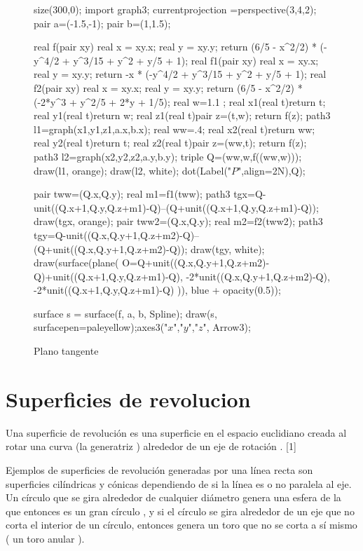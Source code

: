\documentclass[a4paper]{book}
\begin{document}
\begin{figure}[!ht]
	\centering
	\begin{asy}
	size(300,0);
	import graph3;
	currentprojection =perspective(3,4,2);
	pair a=(-1.5,-1);
	pair b=(1,1.5);

	real f(pair xy) {
	real x = xy.x; real y = xy.y;
	return (6/5 - x^2/2) * (-y^4/2 + y^3/15 + y^2 + y/5 + 1);
	}
	real f1(pair xy) {
	real x = xy.x; real y = xy.y;
	return -x * (-y^4/2 + y^3/15 + y^2 + y/5 + 1);
	}
	real f2(pair xy) {
	real x = xy.x; real y = xy.y;
	return (6/5 - x^2/2) * (-2*y^3 + y^2/5 + 2*y + 1/5);
	}
	real w=1.1 ;
	real x1(real t){return t;}
	real y1(real t){return w;}
	real z1(real t){pair z=(t,w); return f(z);}
	path3 l1=graph(x1,y1,z1,a.x,b.x);
	real ww=.4;
	real x2(real t){return ww;}
	real y2(real t){return t;}
	real z2(real t){pair z=(ww,t); return f(z);}
	path3 l2=graph(x2,y2,z2,a.y,b.y);
	triple Q=(ww,w,f((ww,w)));
	draw(l1, orange);
	draw(l2, white);
	dot(Label("$P$",align=2N),Q);

	pair tww=(Q.x,Q.y);
	real m1=f1(tww);
	path3 tgx=Q-unit((Q.x+1,Q.y,Q.z+m1)-Q)--(Q+unit((Q.x+1,Q.y,Q.z+m1)-Q));
	draw(tgx, orange);
	pair tww2=(Q.x,Q.y);
	real m2=f2(tww2);
	path3 tgy=Q-unit((Q.x,Q.y+1,Q.z+m2)-Q)--(Q+unit((Q.x,Q.y+1,Q.z+m2)-Q));
	draw(tgy, white);
	draw(surface(plane(
	O=Q+unit((Q.x,Q.y+1,Q.z+m2)-Q)+unit((Q.x+1,Q.y,Q.z+m1)-Q),
	-2*unit((Q.x,Q.y+1,Q.z+m2)-Q),
	-2*unit((Q.x+1,Q.y,Q.z+m1)-Q)
	)), blue + opacity(0.5));

	surface s = surface(f, a, b, Spline);
	draw(s, surfacepen=paleyellow);axes3("$x$","$y$","$z$", Arrow3);
	\end{asy}
	\caption{Plano tangente}
\end{figure}

\section{Superficies de revolucion}

Una superficie de revolución es una superficie en el espacio euclidiano creada al rotar una curva (la generatriz ) alrededor de un eje de rotación . [1]

Ejemplos de superficies de revolución generadas por una línea recta son superficies cilíndricas y cónicas dependiendo de si la línea es o no paralela al eje. Un círculo que se gira alrededor de cualquier diámetro genera una esfera de la que entonces es un gran círculo , y si el círculo se gira alrededor de un eje que no corta el interior de un círculo, entonces genera un toro que no se corta a sí mismo ( un toro anular ).
\end{document}
